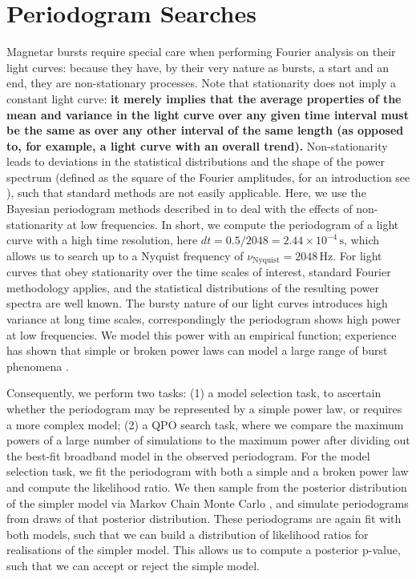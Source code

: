 \documentclass[numberedappendix]{emulateapj}
\newcommand{\project}[1]{\textsl{#1}}
\begin{document}
\section{Periodogram Searches}
\label{sec:analysis}

Magnetar bursts require special care when performing Fourier analysis on their light curves: because they have, by their very nature as bursts, a start and an end, they are non-stationary processes. Note that stationarity does not imply a constant light curve: \textbf{it merely implies that the average properties of the mean and variance in the light curve over any given time interval must be the same as over any other interval of the same length (as opposed to, for example, a light curve with an overall trend).} Non-stationarity leads to deviations in the statistical distributions and the shape of the power spectrum (defined as the square of the Fourier amplitudes, for an introduction see \citealp{vanderklis1989}), such that standard methods are not easily applicable.
Here, we use the Bayesian periodogram methods described in \citet{huppenkothen2013} to deal with the effects of non-stationarity at low frequencies. In short, we compute the periodogram of a light curve with a high time resolution, here $dt = 0.5/2048 = 2.44 \times 10^{-4} \, \mathrm{s}$, which allows us to search up to a Nyquist frequency of $\nu_{\mathrm{Nyquist}} = 2048 \, \mathrm{Hz}$. For light curves that obey stationarity over the time scales of interest, standard Fourier methodology applies, and the statistical distributions of the resulting power spectra are well known. The bursty nature of our light curves introduces high variance at long time scales, correspondingly the periodogram shows high power at low frequencies. We model this power with an empirical function; experience has shown that simple or broken power laws can model a large range of burst phenomena \citep{huppenkothen2013}. 

Consequently, we perform two tasks: (1) a model selection task, to ascertain whether the periodogram may be represented by a simple power law, or requires a more complex model; (2) a QPO search task, where we compare the maximum powers of a large number of simulations to the maximum power after dividing out the best-fit broadband model in the observed periodogram. For the model selection task, we fit the periodogram with both a simple and a broken power law and compute the likelihood ratio. We then sample from the posterior distribution of the simpler model via Markov Chain Monte Carlo \citep[MCMC; using the freely available \textit{Python} code \project{emcee},][]{foreman2013}, and simulate periodograms from draws of that posterior distribution. These periodograms are again fit with both models, such that we can build a distribution of likelihood ratios for realisations of the simpler model. This allows us to compute a posterior p-value, such that we can accept or reject the simple model. 
\end{document}
